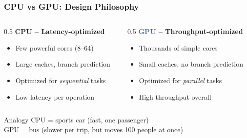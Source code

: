 \documentclass[aspectratio=169]{beamer}
\begin{document}
\begin{frame}
	\frametitle{CPU vs GPU: Design Philosophy}
	\begin{columns}
		\begin{column}{0.5\textwidth}
			\textbf{\textcolor{codegreen}{CPU} -- Latency-optimized}
			\begin{itemize}
				\item Few powerful cores (8--64)
				\item Large caches, branch prediction
				\item Optimized for \textit{sequential} tasks
				\item Low latency per operation
			\end{itemize}
		\end{column}
		\begin{column}{0.5\textwidth}
			\textbf{\textcolor{highlight}{GPU} -- Throughput-optimized}
			\begin{itemize}
				\item Thousands of simple cores
				\item Small caches, no branch prediction
				\item Optimized for \textit{parallel} tasks
				\item High throughput overall
			\end{itemize}
		\end{column}
	\end{columns}
	\vspace{1em}
	\begin{block}{Analogy}
		CPU = sports car (fast, one passenger) \\
		GPU = bus (slower per trip, but moves 100 people at once)
	\end{block}
\end{frame}
\end{document}
